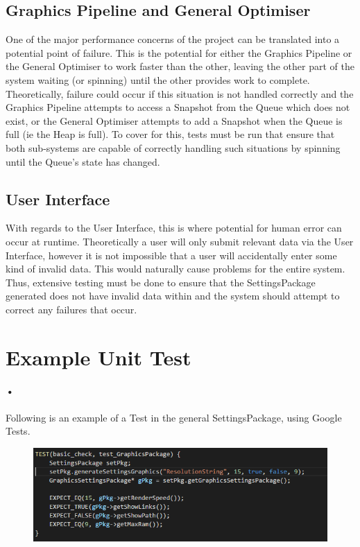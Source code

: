 \documentclass[11pt]{article}
\begin{document}
\subsection{Graphics Pipeline and General Optimiser}
One of the major performance concerns of the project can be translated into a potential point of failure. This is the potential for either the Graphics Pipeline or the General Optimiser to work faster than the other, leaving the other part of the system waiting (or spinning) until the other provides work to complete. Theoretically, failure could occur if this situation is not handled correctly and the Graphics Pipeline attempts to access a Snapshot from the Queue which does not exist, or the General Optimiser attempts to add a Snapshot when the Queue is full (ie the Heap is full). 
\newline To cover for this, tests must be run that ensure that both sub-systems are capable of correctly handling such situations by spinning until the Queue's state has changed.
\subsection{User Interface}
With regards to the User Interface, this is where potential for human error can occur at runtime. Theoretically a user will only submit relevant data via the User Interface, however it is not impossible that a user will accidentally enter some kind of invalid data. This would naturally cause problems for the entire system.
\newline Thus, extensive testing must be done to ensure that the SettingsPackage generated does not have invalid data within and the system should attempt to correct any failures that occur.


\section{Example Unit Test}
\paragraph{•}
Following is an example of a Test in the general SettingsPackage, using Google Tests.
\begin{figure}[h]
\includegraphics[scale=0.7]{GTest.png}
\end{figure}
\end{document}
